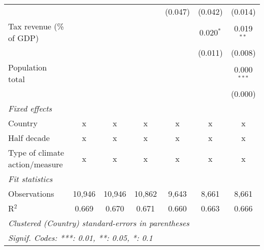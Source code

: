 \begin{tabular}{lcccccc}
                                                   &         &               &                & (0.047)        & (0.042)        & (0.014)\\   
   Tax revenue (\% of GDP)                         &         &               &                &                & 0.020$^{*}$    & 0.019$^{**}$\\   
                                                   &         &               &                &                & (0.011)        & (0.008)\\   
   Population total                                &         &               &                &                &                & 0.000$^{***}$\\   
                                                   &         &               &                &                &                & (0.000)\\   
   \emph{Fixed effects}\\
   Country                                         & x       & x             & x              & x              & x              & x\\  
   Half decade                                     & x       & x             & x              & x              & x              & x\\  
   Type of climate action/measure                  & x       & x             & x              & x              & x              & x\\  
   \midrule \emph{Fit statistics}\\
   Observations                                    & 10,946  & 10,946        & 10,862         & 9,643          & 8,661          & 8,661\\  
   R$^2$                                           & 0.669   & 0.670         & 0.671          & 0.660          & 0.663          & 0.666\\  
   \midrule
   \multicolumn{7}{l}{\emph{Clustered (Country) standard-errors in parentheses}}\\
   \multicolumn{7}{l}{\emph{Signif. Codes: ***: 0.01, **: 0.05, *: 0.1}}\\
\end{tabular}
\par\endgroup


